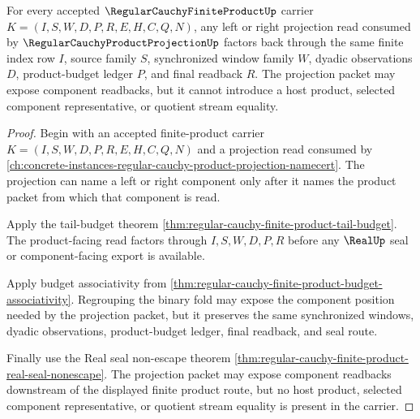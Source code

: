 \begin{theorem}
\label{thm:regular-cauchy-finite-product-projection-roundtrip}
For every accepted $\RegularCauchyFiniteProductUp$ carrier $K=(I,S,W,D,P,R,E,H,C,Q,N)$, any left or right projection read consumed by $\RegularCauchyProductProjectionUp$ factors back through the same finite index row $I$, source family $S$, synchronized window family $W$, dyadic observations $D$, product-budget ledger $P$, and final readback $R$. The projection packet may expose component readbacks, but it cannot introduce a host product, selected component representative, or quotient stream equality.
\end{theorem}
\begin{proof}
Begin with an accepted finite-product carrier $K=(I,S,W,D,P,R,E,H,C,Q,N)$ and a projection read consumed by \autoref{ch:concrete-instances-regular-cauchy-product-projection-namecert}. The projection can name a left or right component only after it names the product packet from which that component is read.

Apply the tail-budget theorem \autoref{thm:regular-cauchy-finite-product-tail-budget}. The product-facing read factors through $I,S,W,D,P,R$ before any $\RealUp$ seal or component-facing export is available.

Apply budget associativity from \autoref{thm:regular-cauchy-finite-product-budget-associativity}. Regrouping the binary fold may expose the component position needed by the projection packet, but it preserves the same synchronized windows, dyadic observations, product-budget ledger, final readback, and seal route.

Finally use the Real seal non-escape theorem \autoref{thm:regular-cauchy-finite-product-real-seal-nonescape}. The projection packet may expose component readbacks downstream of the displayed finite product route, but no host product, selected component representative, or quotient stream equality is present in the carrier.
\end{proof}

